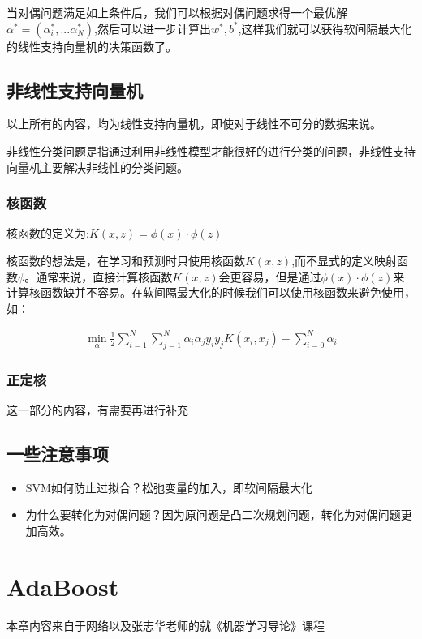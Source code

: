 	当对偶问题满足如上条件后，我们可以根据对偶问题求得一个最优解$\alpha^*=(\alpha_i^*,...\alpha_N^*)$,然后可以进一步计算出$w^*,b^*$,这样我们就可以获得软间隔最大化的线性支持向量机的决策函数了。
	
	
	\subsection{非线性支持向量机}
	以上所有的内容，均为线性支持向量机，即使对于线性不可分的数据来说。
	
	非线性分类问题是指通过利用非线性模型才能很好的进行分类的问题，非线性支持向量机主要解决非线性的分类问题。
	
	\subsubsection{核函数}
	核函数的定义为:$K(x,z)=\phi(x)\cdot\phi(z)$
	
	核函数的想法是，在学习和预测时只使用核函数$K(x,z)$,而不显式的定义映射函数$\phi$。通常来说，直接计算核函数$K(x,z)$会更容易，但是通过$\phi(x)\cdot\phi(z)$来计算核函数缺并不容易。在软间隔最大化的时候我们可以使用核函数来避免使用，如：
	
	\begin{gather}
	\min_{\alpha} \frac{1}{2}\sum_{i=1}^{N}\sum_{j=1}^{N}\alpha_i \alpha_j y_i y_j K(x_i,x_j) - \sum_{i=0}^{N} \alpha_i
	\end{gather}
	
	\subsubsection{正定核}
	这一部分的内容，有需要再进行补充
	
	
	
	\subsection{一些注意事项}
	\begin{itemize}
		\item SVM如何防止过拟合？松弛变量的加入，即软间隔最大化
		\item 为什么要转化为对偶问题？因为原问题是凸二次规划问题，转化为对偶问题更加高效。
	\end{itemize}
	
	
	



\section{AdaBoost}
	本章内容来自于网络以及张志华老师的就《机器学习导论》课程

